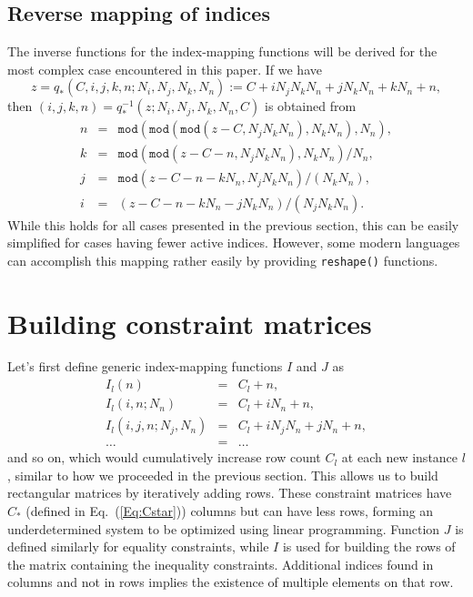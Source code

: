 \documentclass{report}[fleqn,12pt]
\begin{document}
\section{Reverse mapping of indices}
The inverse functions for the index-mapping functions will be derived for the
most complex case encountered in this paper.
If we have
\begin{equation}
	z = q_*(C, i, j, k, n; N_i, N_j, N_k, N_n) := C + iN_jN_kN_n + jN_kN_n + kN_n + n,
\end{equation}
then $(i, j, k, n) = q_*^{-1}(z; N_i, N_j, N_k, N_n, C)$ is obtained from
\begin{eqnarray}
	n &=& \texttt{mod}(\texttt{mod}(\texttt{mod}(z - C, N_jN_kN_n), N_kN_n), N_n), \nonumber \\
	k &=& \texttt{mod}(\texttt{mod}(z - C - n, N_jN_kN_n), N_kN_n)/N_n, \nonumber \\
	j &=& \texttt{mod}(z - C - n - kN_n, N_jN_kN_n)/(N_kN_n), \nonumber \\
	i &=& (z - C - n - kN_n - jN_kN_n)/(N_jN_kN_n).
\end{eqnarray}
While this holds for all cases presented in the previous section, this can be easily simplified
for cases having fewer active indices. However, some modern languages can accomplish this
mapping rather easily by providing \texttt{reshape()} functions.

\chapter{Building constraint matrices}
Let's first define generic index-mapping functions $I$ and $J$ as
\begin{eqnarray}
	\label{Eq:Offsets}
	I_l(n) &=& C_l + n, \nonumber \\
	I_l(i, n; N_n) &=& C_l + iN_n + n, \nonumber \\
	I_l(i, j, n; N_j, N_n) &=& C_l + iN_j N_n + jN_n +n, \\
	\ldots &=& \ldots \nonumber
\end{eqnarray}
and so on, which would cumulatively increase row count $C_l$ at each new instance $l$,
similar to how we proceeded in the previous section.
This allows us to build rectangular matrices by iteratively adding rows.
These constraint matrices have $C_*$ (defined in Eq.~(\ref{Eq:Cstar}))
columns but can have less rows,
forming an underdetermined system to be optimized using linear programming.
Function $J$ is defined similarly for equality constraints, while $I$ is used
for building the rows of the matrix containing the inequality constraints.
Additional indices found in columns and not in rows implies the existence of multiple elements on that row. 
\end{document}
